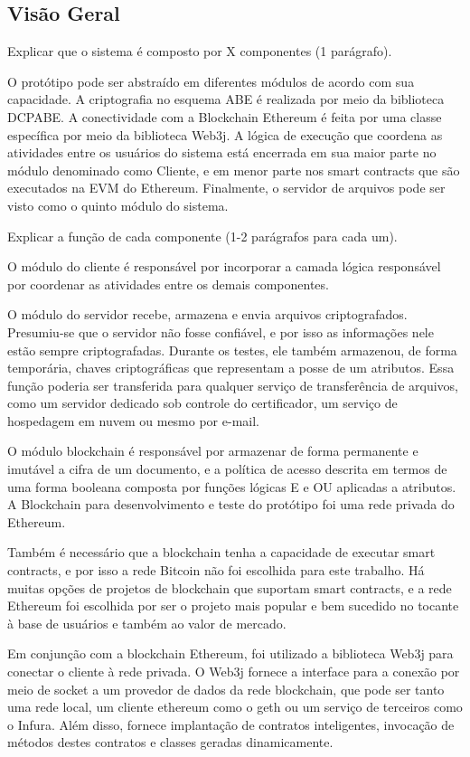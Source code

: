 \documentclass[a4paper,11pt]{article}
\begin{document}
\subsection{Visão Geral}
\label{visaogeral}

{\color{ForestGreen}Explicar que o sistema é composto por X componentes (1 parágrafo).} 

O protótipo pode ser abstraído em diferentes módulos de acordo com sua capacidade. A criptografia no esquema ABE é realizada por meio da biblioteca DCPABE. A conectividade com a Blockchain Ethereum é feita por uma classe específica por meio da biblioteca Web3j. A lógica de execução que coordena as atividades entre os usuários do sistema está encerrada em sua maior parte no módulo denominado como Cliente, e em menor parte nos smart contracts que são executados na EVM do Ethereum. Finalmente, o servidor de arquivos pode ser visto como o quinto módulo do sistema. 

{\color{ForestGreen}Explicar a função de cada componente (1-2 parágrafos para cada um).} 

O módulo do cliente é responsável por incorporar a camada lógica responsável por coordenar as atividades entre os demais componentes.

O módulo do servidor recebe, armazena e envia arquivos criptografados. Presumiu-se que o servidor não fosse confiável, e por isso as informações nele estão sempre criptografadas. Durante os testes, ele também armazenou, de forma temporária, chaves criptográficas que representam a posse de um atributos. Essa função poderia ser transferida para qualquer serviço de transferência de arquivos, como um servidor dedicado sob controle do certificador, um serviço de hospedagem em nuvem ou mesmo por e-mail.

O módulo blockchain é responsável por armazenar de forma permanente e imutável a cifra de um documento, e a política de acesso descrita em termos de uma forma booleana composta por funções lógicas E e OU aplicadas a atributos. A Blockchain para desenvolvimento e teste do protótipo foi uma rede privada do Ethereum.

Também é necessário que a blockchain tenha a capacidade de executar smart contracts, e por isso a rede Bitcoin não foi escolhida para este trabalho. Há muitas opções de projetos de blockchain que suportam smart contracts, e a rede Ethereum foi escolhida por ser o projeto mais popular e bem sucedido no tocante à base de usuários e também ao valor de mercado.

Em conjunção com a blockchain Ethereum, foi utilizado a biblioteca Web3j para conectar o cliente à rede privada. O Web3j fornece a interface para a conexão por meio de socket a um provedor de dados da rede blockchain, que pode ser tanto uma rede local, um cliente ethereum como o geth ou um serviço de terceiros como o Infura. Além disso, fornece implantação de contratos inteligentes, invocação de métodos destes contratos e classes geradas dinamicamente.
\end{document}
